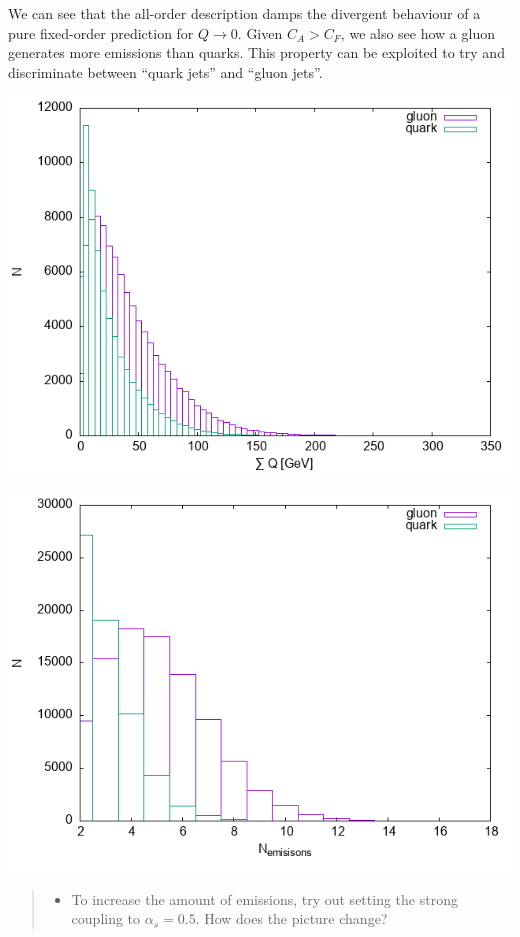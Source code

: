 \documentclass[11pt]{article}
\begin{document}
We can see that the all-order description damps the divergent behaviour of a pure fixed-order prediction for \(Q\to0\).
Given \(C_A > C_F\), we also see how a gluon generates more emissions than quarks.
This property can be exploited to try and discriminate between ``quark jets'' and ``gluon jets''.
\begin{center}
\includegraphics[width=.9\linewidth]{data_Q.png}
\end{center}


\begin{center}
\includegraphics[width=.9\linewidth]{data_N.png}
\end{center}



\begin{quote}
\begin{itemize}
\item To increase the amount of emissions, try out setting the strong coupling to \(\alpha_s=0.5\).
How does the picture change?
\end{itemize}
\end{quote}
\end{document}
